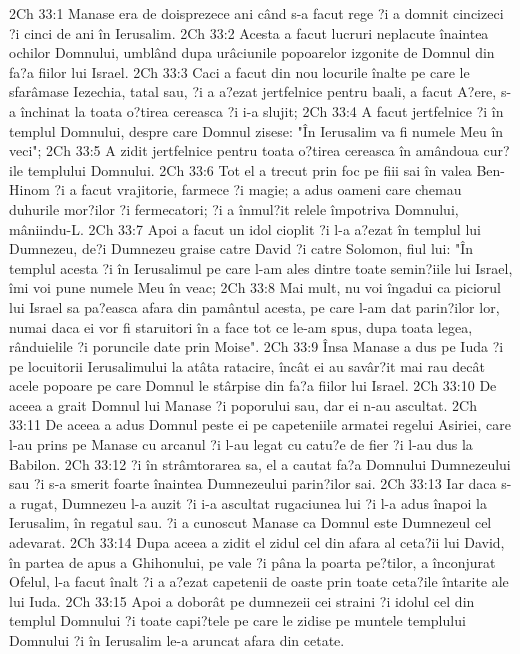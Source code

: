 2Ch 33:1  Manase era de doisprezece ani când s-a facut rege ?i a domnit cincizeci ?i cinci de ani în Ierusalim.
2Ch 33:2  Acesta a facut lucruri neplacute înaintea ochilor Domnului, umblând dupa urâciunile popoarelor izgonite de Domnul din fa?a fiilor lui Israel.
2Ch 33:3  Caci a facut din nou locurile înalte pe care le sfarâmase Iezechia, tatal sau, ?i a a?ezat jertfelnice pentru baali, a facut A?ere, s-a închinat la toata o?tirea cereasca ?i i-a slujit;
2Ch 33:4  A facut jertfelnice ?i în templul Domnului, despre care Domnul zisese: "În Ierusalim va fi numele Meu în veci";
2Ch 33:5  A zidit jertfelnice pentru toata o?tirea cereasca în amândoua cur?ile templului Domnului.
2Ch 33:6  Tot el a trecut prin foc pe fiii sai în valea Ben-Hinom ?i a facut vrajitorie, farmece ?i magie; a adus oameni care chemau duhurile mor?ilor ?i fermecatori; ?i a înmul?it relele împotriva Domnului, mâniindu-L.
2Ch 33:7  Apoi a facut un idol cioplit ?i l-a a?ezat în templul lui Dumnezeu, de?i Dumnezeu graise catre David ?i catre Solomon, fiul lui: "În templul acesta ?i în Ierusalimul pe care l-am ales dintre toate semin?iile lui Israel, îmi voi pune numele Meu în veac;
2Ch 33:8  Mai mult, nu voi îngadui ca piciorul lui Israel sa pa?easca afara din pamântul acesta, pe care l-am dat parin?ilor lor, numai daca ei vor fi staruitori în a face tot ce le-am spus, dupa toata legea, rânduielile ?i poruncile date prin Moise".
2Ch 33:9  Însa Manase a dus pe Iuda ?i pe locuitorii Ierusalimului la atâta ratacire, încât ei au savâr?it mai rau decât acele popoare pe care Domnul le stârpise din fa?a fiilor lui Israel.
2Ch 33:10  De aceea a grait Domnul lui Manase ?i poporului sau, dar ei n-au ascultat.
2Ch 33:11  De aceea a adus Domnul peste ei pe capeteniile armatei regelui Asiriei, care l-au prins pe Manase cu arcanul ?i l-au legat cu catu?e de fier ?i l-au dus la Babilon.
2Ch 33:12  ?i în strâmtorarea sa, el a cautat fa?a Domnului Dumnezeului sau ?i s-a smerit foarte înaintea Dumnezeului parin?ilor sai.
2Ch 33:13  Iar daca s-a rugat, Dumnezeu l-a auzit ?i i-a ascultat rugaciunea lui ?i l-a adus înapoi la Ierusalim, în regatul sau. ?i a cunoscut Manase ca Domnul este Dumnezeul cel adevarat.
2Ch 33:14  Dupa aceea a zidit el zidul cel din afara al ceta?ii lui David, în partea de apus a Ghihonului, pe vale ?i pâna la poarta pe?tilor, a înconjurat Ofelul, l-a facut înalt ?i a a?ezat capetenii de oaste prin toate ceta?ile întarite ale lui Iuda.
2Ch 33:15  Apoi a doborât pe dumnezeii cei straini ?i idolul cel din templul Domnului ?i toate capi?tele pe care le zidise pe muntele templului Domnului ?i în Ierusalim le-a aruncat afara din cetate.
